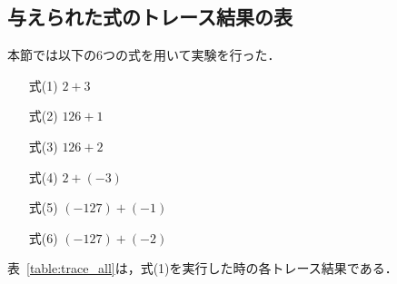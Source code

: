 \documentclass[dvipdfmx]{jsarticle}
\begin{document}
\subsection{与えられた式のトレース結果の表}
本節では以下の6つの式を用いて実験を行った．
\begin{table}[H]
\begin{itemize}
    \item[式(1)] $2+3$
    \item[式(2)] $126+1$
    \item[式(3)] $126+2$
    \item[式(4)] $2+(-3)$
    \item[式(5)] $(-127)+(-1)$
    \item[式(6)] $(-127)+(-2)$
\end{itemize}
\end{table}

表~\ref{table:trace_all}は，式(1)を実行した時の各トレース結果である．
\end{document}
